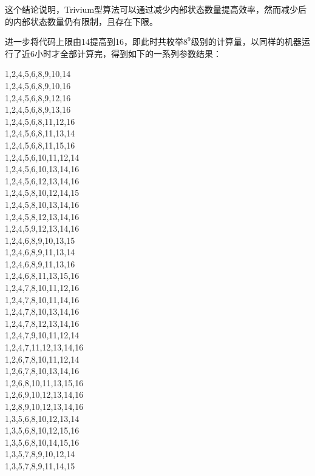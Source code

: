 这个结论说明，Trivium型算法可以通过减少内部状态数量提高效率，然而减少后的内部状态数量仍有限制，且存在下限。

进一步将代码上限由14提高到16，即此时共枚举$8^9$级别的计算量，以同样的机器运行了近6小时才全部计算完，得到如下的一系列参数结果：

\begin{center}
		1,2,4,5,6,8,9,10,14 \\
		1,2,4,5,6,8,9,10,16 \\
		1,2,4,5,6,8,9,12,16 \\
		1,2,4,5,6,8,9,13,16 \\
		1,2,4,5,6,8,11,12,16 \\
		1,2,4,5,6,8,11,13,14 \\
		1,2,4,5,6,8,11,15,16 \\
		1,2,4,5,6,10,11,12,14 \\
		1,2,4,5,6,10,13,14,16 \\
		1,2,4,5,6,12,13,14,16 \\
		1,2,4,5,8,10,12,14,15 \\
		1,2,4,5,8,10,13,14,16 \\
		1,2,4,5,8,12,13,14,16 \\
		1,2,4,5,9,12,13,14,16 \\
		1,2,4,6,8,9,10,13,15 \\
		1,2,4,6,8,9,11,13,14 \\
		1,2,4,6,8,9,11,13,16 \\
		1,2,4,6,8,11,13,15,16 \\
		1,2,4,7,8,10,11,12,16 \\
		1,2,4,7,8,10,11,14,16 \\
		1,2,4,7,8,10,13,14,16 \\
		1,2,4,7,8,12,13,14,16 \\
		1,2,4,7,9,10,11,12,14 \\
		1,2,4,7,11,12,13,14,16 \\
		1,2,6,7,8,10,11,12,14 \\
		1,2,6,7,8,10,13,14,16 \\
		1,2,6,8,10,11,13,15,16 \\
		1,2,6,9,10,12,13,14,16 \\
		1,2,8,9,10,12,13,14,16 \\
		1,3,5,6,8,10,12,13,14 \\
		1,3,5,6,8,10,12,15,16 \\
		1,3,5,6,8,10,14,15,16 \\
		1,3,5,7,8,9,10,12,14 \\
		1,3,5,7,8,9,11,14,15 \\

\end{center}
